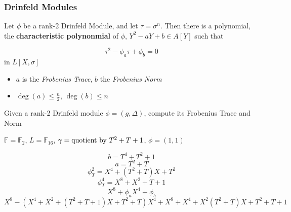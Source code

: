 \documentclass{beamer}
\newcommand{\f}{\mathbb{F}}
\begin{document}
\begin{frame}
\frametitle{Drinfeld Modules}

\begin{theorem}[Gekeler, 1991]
Let $\phi$ be a rank-2 Drinfeld Module, and let $\tau = \sigma^n$. Then there is a polynomial, the \textbf{characteristic polynonmial} of $\phi$,  $Y^2 - aY +b \in A[Y]$ such that

\[\tau^2 -\phi_a\tau + \phi_b = 0\]
in $L[X,\sigma]$
\end{theorem}

\begin{itemize}
    \item $a$ is the \textit{Frobenius Trace}, $b$ the \textit{Frobenius Norm}
    \item $\deg(a) \leq \frac{n}{2}$, $\deg(b) \leq n$
\end{itemize}

\begin{problem}
Given a rank-2 Drinfeld module $\phi = (g,\Delta)$, compute its Frobenius Trace and Norm
\end{problem}

\end{frame}


\begin{frame}{}
    \begin{example}
$\f = \f_2$, $L = \f_{16}$, $\gamma = \textnormal{quotient by } T^2 + T + 1$, $\phi = (1,1)$

\[b = T^4 + T^2 + 1\]
\[a = T^2 + T\]
\[\phi_{T}^2 = X^4 + (T^2 + T)X + T^2\]
\[\phi_T^4 = X^8 + X^2 + T + 1\]
\[X^8 + \phi_aX^4 +  \phi_b\]
\[X^8 - (X^4 + X^2 + (T^2 + T + 1)X + T^2 + T)X^4 + X^8 + X^4 + X^2 (T^2 + T)X + T^2 + T + 1

\]
\end{example}
\end{frame}




\end{document}
